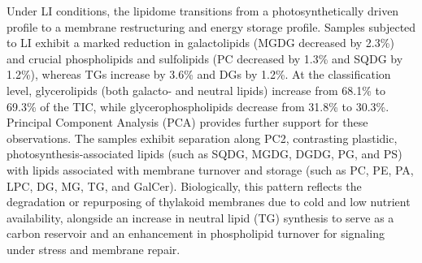 \documentclass[10pt,letterpaper]{article}
\begin{document}
Under LI conditions, the lipidome transitions from a photosynthetically driven profile to a membrane restructuring and energy storage profile. Samples subjected to LI exhibit a marked reduction in galactolipids (MGDG decreased by 2.3\%) and crucial phospholipids and sulfolipids (PC decreased by 1.3\% and SQDG by 1.2\%), whereas TGs increase by 3.6\% and DGs by 1.2\%. At the classification level, glycerolipids (both galacto- and neutral lipids) increase from 68.1\% to 69.3\% of the TIC, while glycerophospholipids decrease from 31.8\% to 30.3\%. Principal Component Analysis (PCA) provides further support for these observations. The samples exhibit separation along PC2, contrasting plastidic, photosynthesis-associated lipids (such as SQDG, MGDG, DGDG, PG, and PS) with lipids associated with membrane turnover and storage (such as PC, PE, PA, LPC, DG, MG, TG, and GalCer). Biologically, this pattern reflects the degradation or repurposing of thylakoid membranes due to cold and low nutrient availability, alongside an increase in neutral lipid (TG) synthesis to serve as a carbon reservoir and an enhancement in phospholipid turnover for signaling under stress and membrane repair.
\end{document}

